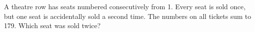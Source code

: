 A theatre row has seats numbered consecutively from 1. Every seat is sold once, but one seat is accidentally sold a second time. The numbers on all tickets sum to 179. Which seat was sold twice?
